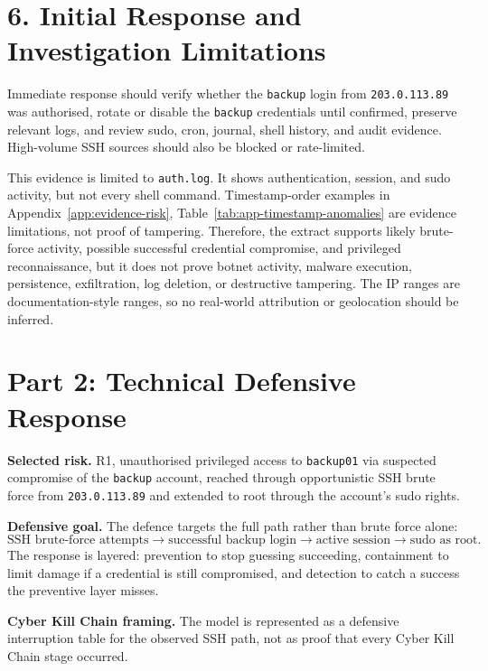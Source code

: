 \documentclass[10pt,a4paper]{article}
\newcommand{\tightsection}[1]{\vspace{6pt}\section*{#1}\vspace{-1pt}}
\begin{document}
\tightsection{6. Initial Response and Investigation Limitations}
Immediate response should verify whether the \texttt{backup} login from \texttt{203.0.113.89} was authorised, rotate or disable the \texttt{backup} credentials until confirmed, preserve relevant logs, and review sudo, cron, journal, shell history, and audit evidence. High-volume SSH sources should also be blocked or rate-limited.

This evidence is limited to \texttt{auth.log}. It shows authentication, session, and sudo activity, but not every shell command. Timestamp-order examples in Appendix~\ref{app:evidence-risk}, Table~\ref{tab:app-timestamp-anomalies} are evidence limitations, not proof of tampering. Therefore, the extract supports likely brute-force activity, possible successful credential compromise, and privileged reconnaissance, but it does not prove botnet activity, malware execution, persistence, exfiltration, log deletion, or destructive tampering. The IP ranges are documentation-style ranges, so no real-world attribution or geolocation should be inferred.

\clearpage
\tightsection{Part 2: Technical Defensive Response}
\textbf{Selected risk.} R1, unauthorised privileged access to \texttt{backup01} via suspected compromise of the \texttt{backup} account, reached through opportunistic SSH brute force from \texttt{203.0.113.89} and extended to root through the account's sudo rights.

\textbf{Defensive goal.} The defence targets the full path rather than brute force alone:
\[
\text{SSH brute-force attempts} \rightarrow \text{successful backup login} \rightarrow \text{active session} \rightarrow \text{sudo as root}.
\]
The response is layered: prevention to stop guessing succeeding, containment to limit damage if a credential is still compromised, and detection to catch a success the preventive layer misses.

\textbf{Cyber Kill Chain framing.} The model is represented as a defensive interruption table for the observed SSH path, not as proof that every Cyber Kill Chain stage occurred.
\end{document}
